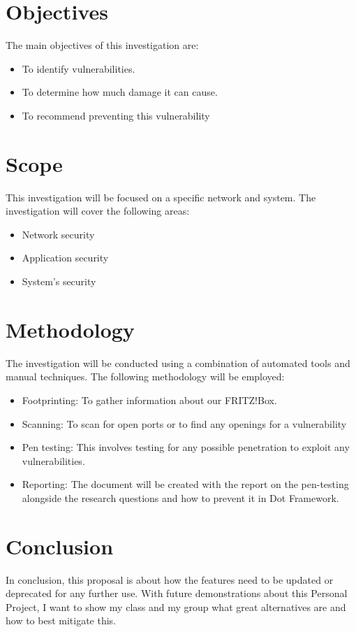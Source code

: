 \documentclass[12pt, letterpaper]{article}
\begin{document}
\section{Objectives}
The main objectives of this investigation are:
\begin{itemize}
    \item To identify vulnerabilities.
    \item To determine how much damage it can cause.
    \item To recommend preventing this vulnerability 
\end{itemize}
\section{Scope}
This investigation will be focused on a specific network and system. The investigation will cover the following areas:
\begin{itemize}
    \item Network security
    \item Application security
    \item System's security
\end{itemize}
\section{Methodology}
The investigation will be conducted using a combination of automated tools and manual techniques. The following methodology will be employed:
\begin{itemize}
    \item Footprinting: To gather information about our FRITZ!Box.
    \item Scanning: To scan for open ports or to find any openings for a vulnerability
    \item Pen testing: This involves testing for any possible penetration to exploit any vulnerabilities.
    \item Reporting: The document will be created with the report on the pen-testing alongside the research questions and how to prevent it in Dot Framework.
\end{itemize}
\section{Conclusion}
In conclusion, this proposal is about how the features need to be updated or deprecated for any further use. With future demonstrations about this Personal Project, I want to show my class and my group what great alternatives are and how to best mitigate this.
\end{document}
